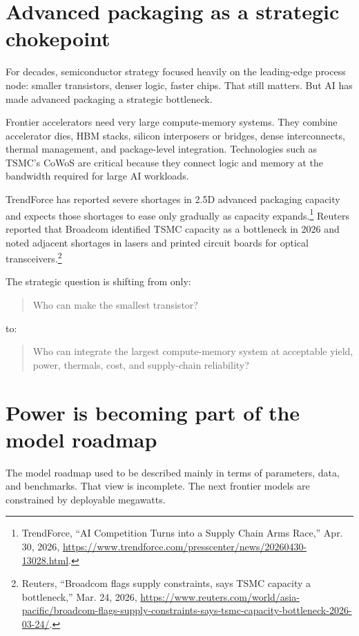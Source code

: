 \section{Advanced packaging as a strategic chokepoint}

For decades, semiconductor strategy focused heavily on the leading-edge process node: smaller transistors, denser logic, faster chips. That still matters. But AI has made advanced packaging a strategic bottleneck.

Frontier accelerators need very large compute-memory systems. They combine accelerator dies, HBM stacks, silicon interposers or bridges, dense interconnects, thermal management, and package-level integration. Technologies such as TSMC's CoWoS are critical because they connect logic and memory at the bandwidth required for large AI workloads.

TrendForce has reported severe shortages in 2.5D advanced packaging capacity and expects those shortages to ease only gradually as capacity expands.\footnote{TrendForce, ``AI Competition Turns into a Supply Chain Arms Race,'' Apr. 30, 2026, \url{https://www.trendforce.com/presscenter/news/20260430-13028.html}.} Reuters reported that Broadcom identified TSMC capacity as a bottleneck in 2026 and noted adjacent shortages in lasers and printed circuit boards for optical transceivers.\footnote{Reuters, ``Broadcom flags supply constraints, says TSMC capacity a bottleneck,'' Mar. 24, 2026, \url{https://www.reuters.com/world/asia-pacific/broadcom-flags-supply-constraints-says-tsmc-capacity-bottleneck-2026-03-24/}.}

The strategic question is shifting from only:

\begin{quote}
Who can make the smallest transistor?
\end{quote}

to:

\begin{quote}
Who can integrate the largest compute-memory system at acceptable yield, power, thermals, cost, and supply-chain reliability?
\end{quote}

\section{Power is becoming part of the model roadmap}

The model roadmap used to be described mainly in terms of parameters, data, and benchmarks. That view is incomplete. The next frontier models are constrained by deployable megawatts.

